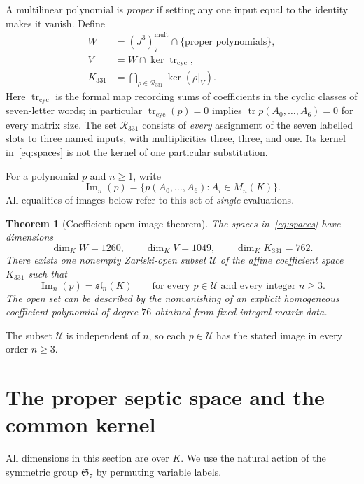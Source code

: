 \documentclass[11pt,reqno]{amsart}
\newtheorem{theorem}{Theorem}[section]
\theoremstyle{definition}
\newcommand{\im}{\operatorname{Im}}
\newcommand{\tr}{\operatorname{tr}}
\newcommand{\cyc}{\operatorname{tr}_{\mathrm{cyc}}}
\newcommand{\Sym}{\mathfrak{S}}
\newcommand{\Ucal}{\mathcal U}
\begin{document}
A multilinear polynomial is \emph{proper} if setting any one input equal to the identity makes it vanish.  Define
\begin{equation}\label{eq:spaces}
\begin{aligned}
 W&=(J^3)_7^{\mathrm{mult}}\cap\{\text{proper polynomials}\},\\
 V&=W\cap\ker\cyc,\\
 K_{331}&=\bigcap_{\rho\in\mathscr R_{331}}\ker(\rho\vert_V).
\end{aligned}
\end{equation}
Here $\cyc$ is the formal map recording sums of coefficients in the cyclic classes of seven-letter words; in particular $\cyc(p)=0$ implies $\tr p(A_0,\ldots,A_6)=0$ for every matrix size.  The set $\mathscr R_{331}$ consists of \emph{every} assignment of the seven labelled slots to three named inputs, with multiplicities three, three, and one.  Its kernel in~\eqref{eq:spaces} is not the kernel of one particular substitution.

For a polynomial $p$ and $n\geq1$, write
\[
 \im_n(p)=\{p(A_0,\ldots,A_6): A_i\in M_n(K)\}.
\]
All equalities of images below refer to this set of \emph{single} evaluations.

\begin{theorem}[Coefficient-open image theorem]\label{thm:main}
The spaces in~\eqref{eq:spaces} have dimensions
\[
 \dim_K W=1260,\qquad \dim_K V=1049,\qquad \dim_K K_{331}=762.
\]
There exists one nonempty Zariski-open subset $\Ucal$ of the affine coefficient space $K_{331}$ such that
\begin{equation}\label{eq:main-image}
 \im_n(p)=\mathfrak{sl}_n(K)\qquad
 \text{for every }p\in\Ucal\text{ and every integer }n\geq3.
\end{equation}
The open set can be described by the nonvanishing of an explicit homogeneous coefficient polynomial of degree $76$ obtained from fixed integral matrix data.
\end{theorem}

The subset $\Ucal$ is independent of $n$, so each $p\in\Ucal$ has the stated image in every order $n\ge3$.

\section{The proper septic space and the common kernel}\label{sec:module}
All dimensions in this section are over $K$.  We use the natural action of the symmetric group $\Sym_7$ by permuting variable labels.
\end{document}
